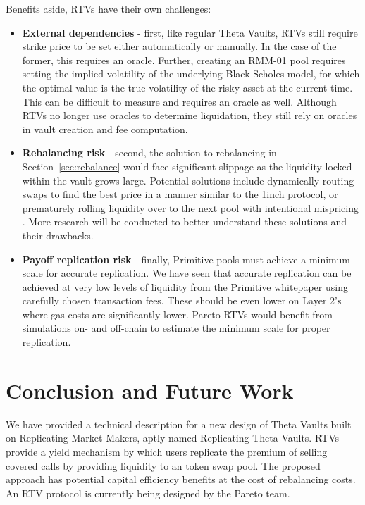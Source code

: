\documentclass[hidelinks, 12pt]{article}
\begin{document}
Benefits aside, RTVs have their own challenges:
\begin{itemize}
    \item \textbf{External dependencies} - first, like regular Theta Vaults, RTVs still require strike price to be set either automatically or manually. In the case of the former, this requires an oracle. Further, creating an RMM-01 pool requires setting the implied volatility of the underlying Black-Scholes model, for which the optimal value is the true volatility of the risky asset at the current time. This can be difficult to measure and requires an oracle as well. Although RTVs no longer use oracles to determine liquidation, they still rely on oracles in vault creation and fee computation.
    \item \textbf{Rebalancing risk} - second, the solution to rebalancing in Section~\ref{sec:rebalance} would face significant slippage as the liquidity locked within the vault grows large. Potential solutions include dynamically routing swaps to find the best price in a manner similar to the 1inch protocol, or prematurely rolling liquidity over to the next pool with intentional mispricing \cite{sterrett2022replicating}. More research will be conducted to better understand these solutions and their drawbacks.
    \item \textbf{Payoff replication risk} - finally, Primitive pools must achieve a minimum scale for accurate replication. We have seen that accurate replication can be achieved at very low levels of liquidity from the Primitive whitepaper using carefully chosen transaction fees. These should be even lower on Layer 2's where gas costs are significantly lower. Pareto RTVs would benefit from simulations on- and off-chain to estimate the minimum scale for proper replication.
\end{itemize}

\section{Conclusion and Future Work}

We have provided a technical description for a new design of Theta Vaults built on Replicating Market Makers, aptly named Replicating Theta Vaults. RTVs provide a yield mechanism by which users replicate the premium of selling covered calls by providing liquidity to an token swap pool. The proposed approach has potential capital efficiency benefits at the cost of rebalancing costs.
An RTV protocol is currently being designed by the Pareto team.
\end{document}
